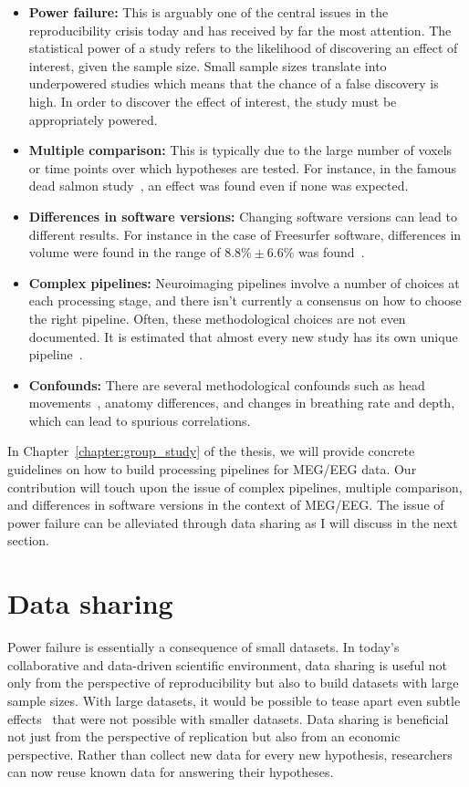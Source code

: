 \begin{itemize}[noitemsep,partopsep=0pt]
\item \textbf{Power failure:} This is arguably one of the central issues in the reproducibility crisis today and has received by far the most attention. The statistical power of a study refers to the likelihood of discovering an effect of interest, given the sample size. Small sample sizes translate into underpowered studies which means that the chance of a false discovery is high. In order to discover the effect of interest, the study must be appropriately powered.
\item \textbf{Multiple comparison:} This is typically due to the large number of voxels or time points over which hypotheses are tested. For instance, in the famous dead salmon study~\citep{bennett2009neural}, an effect was found even if none was expected.
\item \textbf{Differences in software versions:} Changing software versions can lead to different results. For instance in the case of Freesurfer software, differences in volume were found in the range of $8.8\% \pm 6.6\%$ was found~\citep{gronenschild2012effects}.
\item \textbf{Complex pipelines:} Neuroimaging pipelines involve a number of choices at each processing stage, and there isn't currently a consensus on how to choose the right pipeline. Often, these methodological choices are not even documented. It is estimated that almost every new study has its own unique pipeline~\citep{Carp2012289}.
\item \textbf{Confounds:} There are several methodological confounds such as head movements~\citep{yendiki2014spurious}, anatomy differences, and changes in breathing rate and depth, which can lead to spurious correlations.
\end{itemize}

In Chapter~\ref{chapter:group_study} of the thesis, we will provide concrete guidelines on how to build processing pipelines for \ac{MEG}/\ac{EEG} data. Our contribution will touch upon the issue of complex pipelines, multiple comparison, and differences in software versions in the context of \ac{MEG}/\ac{EEG}. The issue of power failure can be alleviated through data sharing as I will discuss in the next section.

\section{Data sharing}
\label{sec:intro_datasharing}
Power failure is essentially a consequence of small datasets. In today's collaborative and data-driven scientific environment, data sharing is useful not only from the perspective of reproducibility but also to build datasets with large sample sizes. With large datasets, it would be possible to tease apart even subtle effects~\citep{smith2017statistical} that were not possible with smaller datasets. Data sharing is beneficial not just from the perspective of replication but also from an economic perspective. Rather than collect new data for every new hypothesis, researchers can now reuse known data for answering their hypotheses.

